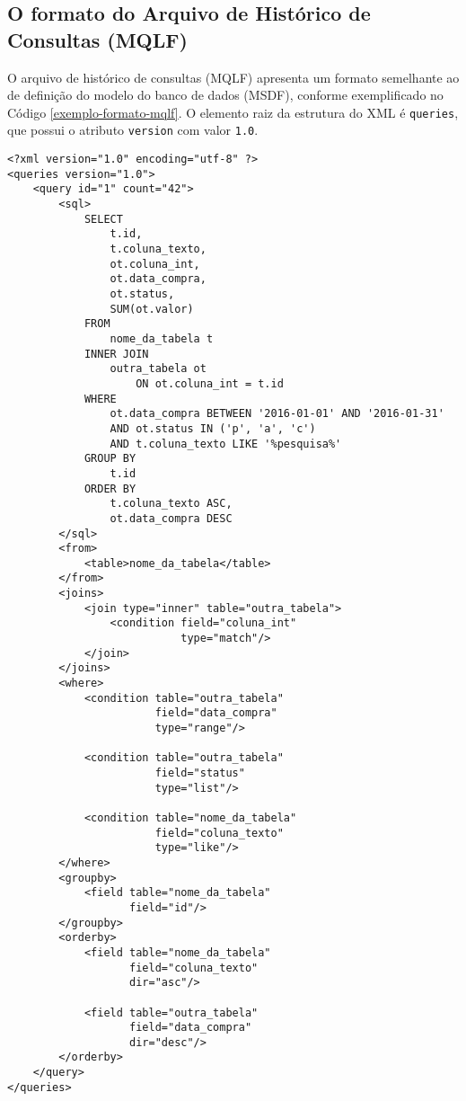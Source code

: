 \subsection{O formato do Arquivo de Histórico de Consultas (MQLF)}
\label{formato-mqlf}

O arquivo de histórico de consultas (MQLF) apresenta um formato semelhante ao de definição do modelo do banco de dados (MSDF), conforme exemplificado no Código \ref{exemplo-formato-mqlf}. O elemento raiz da estrutura do XML é \texttt{queries}, que possui o atributo \texttt{version} com valor \texttt{1.0}.

\begin{lstlisting}[label=exemplo-formato-mqlf, caption={Exemplo de arquivo no formato MQLF.}]
<?xml version="1.0" encoding="utf-8" ?>
<queries version="1.0">
    <query id="1" count="42">
        <sql>
            SELECT
                t.id,
                t.coluna_texto,
                ot.coluna_int,
                ot.data_compra,
                ot.status,
                SUM(ot.valor)
            FROM
                nome_da_tabela t
            INNER JOIN
                outra_tabela ot
                    ON ot.coluna_int = t.id
            WHERE
                ot.data_compra BETWEEN '2016-01-01' AND '2016-01-31'
                AND ot.status IN ('p', 'a', 'c')
                AND t.coluna_texto LIKE '%pesquisa%'
            GROUP BY
                t.id
            ORDER BY
                t.coluna_texto ASC,
                ot.data_compra DESC
        </sql>
        <from>
            <table>nome_da_tabela</table>
        </from>
        <joins>
            <join type="inner" table="outra_tabela">
                <condition field="coluna_int"
                           type="match"/>
            </join>
        </joins>
        <where>
            <condition table="outra_tabela"
                       field="data_compra"
                       type="range"/>

            <condition table="outra_tabela"
                       field="status"
                       type="list"/>

            <condition table="nome_da_tabela"
                       field="coluna_texto"
                       type="like"/>
        </where>
        <groupby>
            <field table="nome_da_tabela"
                   field="id"/>
        </groupby>
        <orderby>
            <field table="nome_da_tabela"
                   field="coluna_texto"
                   dir="asc"/>

            <field table="outra_tabela"
                   field="data_compra"
                   dir="desc"/>
        </orderby>
    </query>
</queries>
\end{lstlisting}

